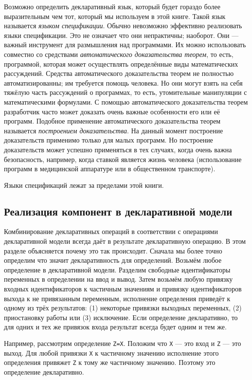 Возможно определить декларативный язык, который будет гораздо более выразительным чем тот, который мы используем в этой книге. Такой язык называется \emph{языком спецификации}. Обычно невозможно эффективно реализовать языки спецификации. Это не означает что они непрактичны; наоборот. Они --- важный инструмент для размышления над программами. Их можно использовать совместно со средствами \emph{автоматического доказательства теорем}, то есть, программой, которая может осуществлять определённые виды математических рассуждений. Средства автоматического доказательства теорем не полностью автоматизированны; им требуется помощь человека. Но они могут взять на себя тяжёлую часть рассуждений о программах, то есть, утомительные манипуляции с математическими формулами. С помощью автоматического доказательства теорем разработчик часто может доказать очень важные особенности его или её программ. Подобное применение автоматического доказательства теорем называется \emph{построением доказательства}. На данный момент построение доказательств применимо только для малых программ. Но построение доказательств может успешно применяться в тех случаях, когда очень важна безопасность, например, когда ставкой является жизнь человека (использование программ в медицинской аппаратуре или в общественном транспорте).

Языки спецификаций лежат за пределами этой книги.

\subsection{Реализация компонент в декларативной модели}

Комбинирование декларативных операций в соответствии с операциями декларативной модели всегда даёт в результате декларативную операцию. В этом разделе объясняется почему это так происходит. Сначала мы более точно определим что значит декларативность для определений. Возьмём любое определение в декларативной модели. Разделим свободные идентификаторы переменных в определении на ввод и вывод. Затем возьмём любую привязку входных идентификаторов к частичным значениям и привязку идентификаторов выхода к не привязанным переменным, исполнение определения приведёт к одному из трёх результатов: (1) некоторые привязки выходных переменных, (2) приостановку работы или (3) исключение. Если определение декларативно, то для одних и тех же привязок входа результат всегда будет одним и тем же.

Например, рассмотрим определение \lstinline!Z=X!. Положим что \lstinline!X! --- это вход и \lstinline!Z! --- это выход. Для любой привязки \lstinline!X! к частичному значению исполнение этого определения привяжет \lstinline!Z! к тому же частичному значению. Поэтому это определение декларативно.

